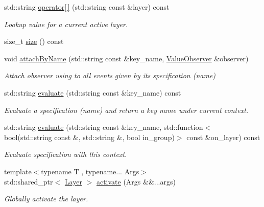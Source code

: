 \begin{DoxyCompactItemize}
\item 
std\-::string \hyperlink{classkdb_1_1Context_a331463d2eec8d2a5fdb8ffe4bfc181f6}{operator\mbox{[}$\,$\mbox{]}} (std\-::string const \&layer) const 
\begin{DoxyCompactList}\small\item\em Lookup value for a current active layer. \end{DoxyCompactList}\item 
size\-\_\-t \hyperlink{classkdb_1_1Context_add39417df86eb963a1f04a8812c51917}{size} () const 
\item 
void \hyperlink{classkdb_1_1Context_afcbfe897ee36eb4fee23640051122e54}{attach\-By\-Name} (std\-::string const \&key\-\_\-name, \hyperlink{classkdb_1_1ValueObserver}{Value\-Observer} \&observer)
\begin{DoxyCompactList}\small\item\em Attach observer using to all events given by its specification (name) \end{DoxyCompactList}\item 
std\-::string \hyperlink{classkdb_1_1Context_a130675fbe20f1b20eaa462ec6a9fe98e}{evaluate} (std\-::string const \&key\-\_\-name) const 
\begin{DoxyCompactList}\small\item\em Evaluate a specification (name) and return a key name under current context. \end{DoxyCompactList}\item 
std\-::string \hyperlink{classkdb_1_1Context_a0687e0df9fbb3e2670fb45f1f9afdfc9}{evaluate} (std\-::string const \&key\-\_\-name, std\-::function$<$ bool(std\-::string const \&, std\-::string \&, bool in\-\_\-group)$>$ const \&on\-\_\-layer) const 
\begin{DoxyCompactList}\small\item\em Evaluate specification with this context. \end{DoxyCompactList}\item 
{\footnotesize template$<$typename T , typename... Args$>$ }\\std\-::shared\-\_\-ptr$<$ \hyperlink{classkdb_1_1Layer}{Layer} $>$ \hyperlink{classkdb_1_1Context_a28b78596e359631e452d768b7861fb84}{activate} (Args \&\&...args)
\begin{DoxyCompactList}\small\item\em Globally activate the layer. \end{DoxyCompactList}\end{DoxyCompactItemize}


